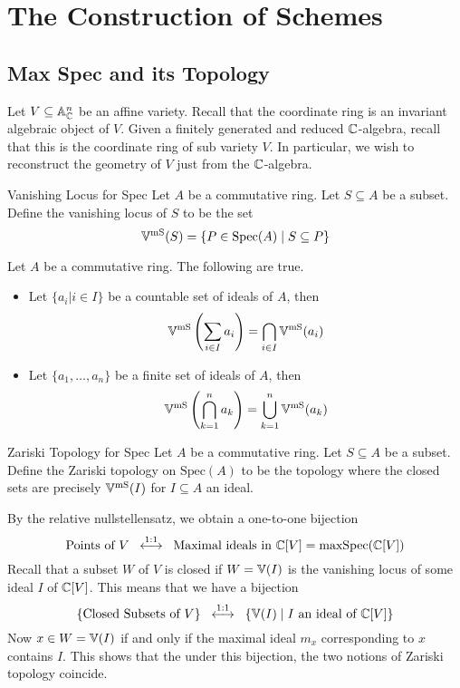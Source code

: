 \documentclass[a4paper]{article}
\begin{document}
\pagebreak
\section{The Construction of Schemes}
\subsection{Max Spec and its Topology}
Let $V\subseteq\mathbb{A}_{\mathbb{C}}^n$ be an affine variety. Recall that the coordinate ring is an invariant algebraic object of $V$. Given a finitely generated and reduced $\mathbb{C}$-algebra, recall that this is the coordinate ring of sub variety $V$. In particular, we wish to reconstruct the geometry of $V$ just from the $\mathbb{C}$-algebra. 

\begin{defn}{Vanishing Locus for Spec}{} Let $A$ be a commutative ring. Let $S\subseteq A$ be a subset. Define the vanishing locus of $S$ to be the set $$\mathbb{V}^{\text{mS}}(S)=\{P\in\text{Spec}(A)\;|\;S\subseteq P\}$$
\end{defn}

\begin{lmm}{}{} Let $A$ be a commutative ring. The following are true. 
\begin{itemize}
\item Let $\{a_i|i\in I\}$ be a countable set of ideals of $A$, then $$\mathbb{V}^\text{mS}\left(\sum_{i\in I}a_i\right)=\bigcap_{i\in I}\mathbb{V}^\text{mS}(a_i)$$
\item Let $\{a_1,\dots,a_n\}$ be a finite set of ideals of $A$, then $$\mathbb{V}^\text{mS}\left(\bigcap_{k=1}^na_k\right)=\bigcup_{k=1}^n\mathbb{V}^\text{mS}(a_k)$$
\end{itemize}
\end{lmm}

\begin{defn}{Zariski Topology for Spec}{} Let $A$ be a commutative ring. Let $S\subseteq A$ be a subset. Define the Zariski topology on $\text{Spec}(A)$ to be the topology where the closed sets are precisely $\mathbb{V}^\text{mS}(I)$ for $I\subseteq A$ an ideal. 
\end{defn}

By the relative nullstellensatz, we obtain a one-to-one bijection $$\text{Points of }V\;\;\overset{1:1}{\longleftrightarrow}\;\;\text{Maximal ideals in }\mathbb{C}[V]=\text{maxSpec}(\mathbb{C}[V])$$ Recall that a subset $W$ of $V$ is closed if $W=\mathbb{V}(I)$ is the vanishing locus of some ideal $I$ of $\mathbb{C}[V]$. This means that we have a bijection $$\{\text{Closed Subsets of }V\}\;\;\overset{1:1}{\longleftrightarrow}\;\;\{\mathbb{V}(I)\;|\;I\text{ an ideal of }\mathbb{C}[V]\}$$ Now $x\in W=\mathbb{V}(I)$ if and only if the maximal ideal $m_x$ corresponding to $x$ contains $I$. This shows that the under this bijection, the two notions of Zariski topology coincide. 
\end{document}
